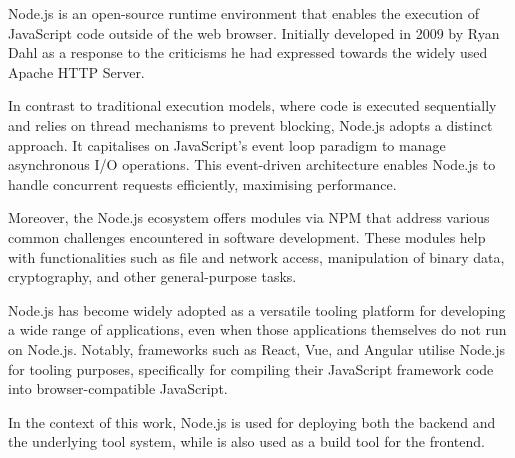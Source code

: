 Node.js is an open-source runtime environment that enables the execution of JavaScript code outside of the web browser. Initially developed in 2009 by Ryan Dahl as a response to the criticisms he had expressed towards the widely used Apache HTTP Server.

In contrast to traditional execution models, where code is executed sequentially and relies on thread mechanisms to prevent blocking, Node.js adopts a distinct approach. It capitalises on JavaScript's event loop paradigm to manage asynchronous I/O operations. This event-driven architecture enables Node.js to handle concurrent requests efficiently, maximising performance.

Moreover, the Node.js ecosystem offers modules via NPM that address various common challenges encountered in software development. These modules help with functionalities such as file and network access, manipulation of binary data, cryptography, and other general-purpose tasks.

Node.js has become widely adopted as a versatile tooling platform for developing a wide range of applications, even when those applications themselves do not run on Node.js. Notably, frameworks such as React, Vue, and Angular utilise Node.js for tooling purposes, specifically for compiling their JavaScript framework code into browser-compatible JavaScript.

In the context of this work, Node.js is used for deploying both the backend and the underlying tool system, while is also used as a build tool for the frontend.
